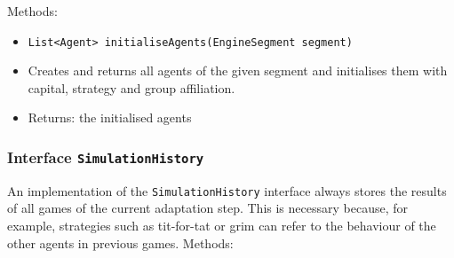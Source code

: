 \documentclass[parskip=full,11pt]{scrartcl}
\begin{document}
Methods:
\begin{itemize}\itemsep -10pt
\item \texttt{List<Agent> initialiseAgents(EngineSegment segment)}
\item[] Creates and returns all agents of the given segment and initialises them with capital, strategy and group affiliation.
\item[] Returns: the initialised agents
\end{itemize}

\subsubsection{Interface \texttt{SimulationHistory}}
An implementation of the \texttt{SimulationHistory} interface always stores the results of all games of the current adaptation step. This is necessary because, for example, strategies such as tit-for-tat or grim can refer to the behaviour of the other agents in previous games.
\newpage
Methods:
\end{document}
